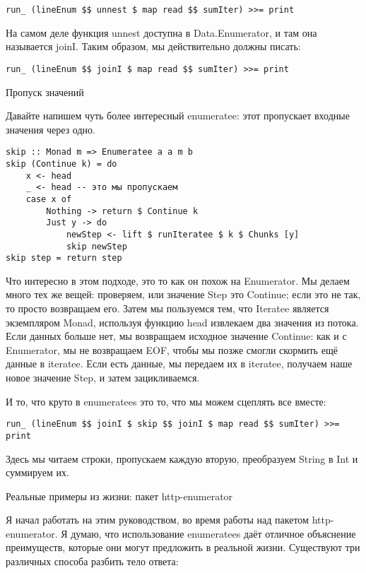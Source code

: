 \begin{lstlisting}
run_ (lineEnum $$ unnest $ map read $$ sumIter) >>= print
\end{lstlisting}

На самом деле функция unnest доступна в Data.Enumerator, и там она называется joinI. Таким образом, мы действительно должны писать:

\begin{lstlisting}
run_ (lineEnum $$ joinI $ map read $$ sumIter) >>= print
\end{lstlisting}

Пропуск значений

Давайте напишем чуть более интересный enumeratee: этот пропускает входные значения через одно.

\begin{lstlisting}
skip :: Monad m => Enumeratee a a m b
skip (Continue k) = do
    x <- head
    _ <- head -- это мы пропускаем
    case x of
        Nothing -> return $ Continue k
        Just y -> do
            newStep <- lift $ runIteratee $ k $ Chunks [y]
            skip newStep
skip step = return step
\end{lstlisting}

Что интересно в этом подходе, это то как он похож на Enumerator. Мы делаем много тех же вещей: проверяем, или значение Step это Continue; если это не так, то просто возвращаем его. Затем мы пользуемся тем, что Iteratee является экземпляром Monad, используя функцию head извлекаем два значения из потока. Если данных больше нет, мы возвращаем исходное значение Continue: как и с Enumerator, мы не возвращаем EOF, чтобы мы позже смогли скормить ещё данные в iteratee. Если есть данные, мы передаем их в iteratee, получаем наше новое значение Step, и затем зацикливаемся.

И то, что круто в enumeratees это то, что мы можем сцеплять все вместе:

\begin{lstlisting}
run_ (lineEnum $$ joinI $ skip $$ joinI $ map read $$ sumIter) >>= print
\end{lstlisting}

Здесь мы читаем строки, пропускаем каждую вторую, преобразуем String в Int и суммируем их.

Реальные примеры из жизни: пакет http-enumerator

Я начал работать на этим руководством, во время работы над пакетом http-enumerator. Я думаю, что использование enumeratees даёт отличное объяснение преимуществ, которые они могут предложить в реальной жизни. Существуют три различных способа разбить тело ответа:

